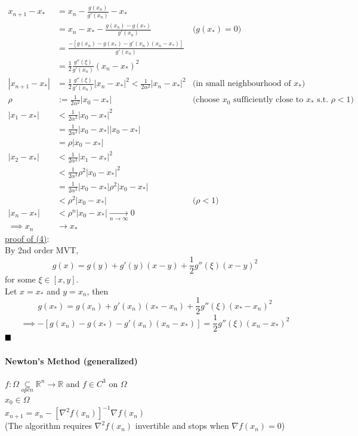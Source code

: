 \documentclass[11pt]{article}
\newcommand{\real}[0]{\mathbb{R}}
\newcommand{\under}[1]{\underline{#1}}
\newcommand{\qed}[0]{$\hfill\blacksquare$}
\begin{document}
\begin{align}
	x_{n+1} - x_* &= x_n - \frac{g(x_n)}{g'(x_n)} - x_* \\
	&= x_n - x_* - \frac{g(x_n) - g(x_*)}{g'(x_n)} &\text{($g(x_*) = 0$)}\\
	&= \frac{-[g(x_n) - g(x_*) - g'(x_n)(x_n - x_*)]}{g'(x_n)} \\
	&= \frac{1}{2}\frac{g''(\xi)}{g'(x_n)}(x_n - x_*)^2 \\
	|x_{n+1} - x_*| &= \frac{1}{2}\frac{g''(\xi)}{g'(x_n)}|x_n - x_*|^2 < \frac{1}{2\alpha^2}|x_n - x_*|^2 &\text{(in small neighbourhood of $x_*$)} \\
	\rho &:= \frac{1}{2\alpha^2} |x_0 - x_*| &\text{(choose $x_0$ sufficiently close to $x_*$ s.t. $\rho < 1$)} \\
	|x_1 - x_*| &< \frac{1}{2\alpha^2}|x_0 - x_*|^2 \\
	&= \frac{1}{2\alpha^2}|x_0 - x_*||x_0 - x_*| \\
	&= \rho|x_0 - x_*| \\
	|x_2 - x_*| &< \frac{1}{2\alpha^2}|x_1 - x_*|^2 \\
	&< \frac{1}{2\alpha^2}\rho^2|x_0 - x_*|^2 \\
	&= \frac{1}{2\alpha^2}|x_0 - x_*| \rho^2 |x_0 - x_*| \\
	&< \rho^2 |x_0 - x_*| &\text{($\rho < 1$)} \\
	|x_n - x_*| &< \rho^n |x_0 - x_*| \underset{n \rightarrow \infty}{\rightarrow} 0 \\
	\implies x_n &\rightarrow x_*
\end{align}
\under{proof of (4)}: \\
By 2nd order MVT,
$$g(x) = g(y) + g'(y)(x-y) + \frac{1}{2}g''(\xi) (x-y)^2$$
for some $\xi \in [x, y]$. \\
Let $x = x_*$ and $y = x_n$, then
$$g(x_*) = g(x_n) + g'(x_n)(x_* - x_n) + \frac{1}{2}g''(\xi)(x_* - x_n)^2$$
$$\implies -[g(x_n) - g(x_*) - g'(x_n)(x_n - x_*)] = \frac{1}{2}g''(\xi)(x_n - x_*)^2 $$
\qed
\paragraph{Newton's Method (generalized)}
$f: \Omega \underset{open}{\subseteq} \real^n \rightarrow \real$ and $f \in C^3$ on $\Omega$ \\
$x_0 \in \Omega$ \\
$x_{n+1} = x_n - [\nabla^2 f(x_n)]^{-1} \nabla f(x_n)$ \\
(The algorithm requires $\nabla^2 f(x_n)$ invertible and stops when $\nabla f(x_n) = 0$)
\end{document}

